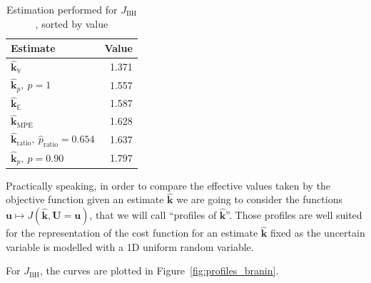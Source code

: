 \documentclass[preprint, review, 1p]{elsarticle}
\newcommand{\Ex}{\mathbb{E}}
\newcommand{\hatkmean}{\hat{\mathbf{k}}_{\Ex}}
\newcommand{\hatkvar}{\hat{\mathbf{k}}_{\mathbb{V}}}
\newcommand{\hatkmpe}{\hat{\mathbf{k}}_{\mathrm{MPE}}}
\newcommand{\kest}{\hat{\mathbf{k}}}
\newcommand{\JBH}{J_{\mathrm{BH}}}
\begin{document}
\begin{table}[!h]
  \centering
\caption{Estimation performed for $\JBH$, sorted by value}
\begin{tabular}{lr}
  \toprule
Estimate & Value \\ \midrule
$\hatkvar$ & 1.371 \\ 
$\kest_{p},~p=1$ & 1.557 \\ 
$\hatkmean$ & 1.587 \\ 
$\kest_{\mathrm{MPE}}$ & 1.628 \\ 
$\kest_{\mathrm{ratio}},~\hat{p}_{\mathrm{ratio}}=0.654$ & 1.637 \\ 
$\kest_p,~p=0.90$ & 1.797 \\  \bottomrule
\end{tabular}
\label{tab:recap_estimates_branin}
\end{table}
Practically speaking, in order to compare the effective values taken by the objective function given an estimate $\kest$ we are going to consider the functions $\mathbf{u} \mapsto J(\kest,\mathbf{U}=\mathbf{u})$, that we will call ``profiles of $\kest$''. Those profiles are well suited for the representation of the cost function for an estimate $\kest$ fixed as the uncertain variable is modelled with a 1D uniform random variable.

For $\JBH$, the curves are plotted in Figure~\ref{fig:profiles_branin}.
\end{document}
